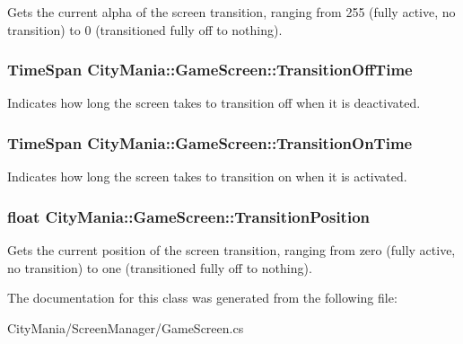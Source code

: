 Gets the current alpha of the screen transition, ranging from 255 (fully active, no transition) to 0 (transitioned fully off to nothing). \hypertarget{classCityMania_1_1GameScreen_a3f775f10cd0d16be17c9cdbdf9f058b8}{
\subsubsection[{TransitionOffTime}]{\setlength{\rightskip}{0pt plus 5cm}TimeSpan CityMania::GameScreen::TransitionOffTime}}
\label{classCityMania_1_1GameScreen_a3f775f10cd0d16be17c9cdbdf9f058b8}


Indicates how long the screen takes to transition off when it is deactivated. \hypertarget{classCityMania_1_1GameScreen_af9bb1ff62e3922e0553977cd8ea5aeb3}{
\subsubsection[{TransitionOnTime}]{\setlength{\rightskip}{0pt plus 5cm}TimeSpan CityMania::GameScreen::TransitionOnTime}}
\label{classCityMania_1_1GameScreen_af9bb1ff62e3922e0553977cd8ea5aeb3}


Indicates how long the screen takes to transition on when it is activated. \hypertarget{classCityMania_1_1GameScreen_ad26489543c8a249c65182b77a5f8c68f}{
\subsubsection[{TransitionPosition}]{\setlength{\rightskip}{0pt plus 5cm}float CityMania::GameScreen::TransitionPosition}}
\label{classCityMania_1_1GameScreen_ad26489543c8a249c65182b77a5f8c68f}


Gets the current position of the screen transition, ranging from zero (fully active, no transition) to one (transitioned fully off to nothing). 

The documentation for this class was generated from the following file:\begin{DoxyCompactItemize}
\item 
CityMania/ScreenManager/GameScreen.cs\end{DoxyCompactItemize}
